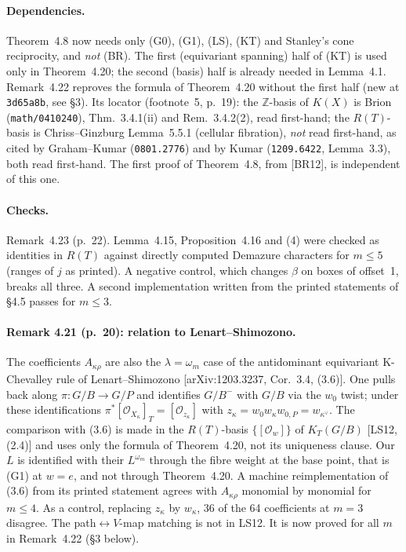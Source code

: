 \documentclass[11pt]{article}
\theoremstyle{plain}
\theoremstyle{remark}
\newcommand{\cO}{\mathcal{O}}
\begin{document}
\paragraph{Dependencies.} Theorem~4.8 now needs only (G0), (G1), (LS), (KT) and Stanley's cone
reciprocity, and \emph{not} (BR). The first (equivariant spanning) half of (KT) is used only in Theorem~4.20; the second (basis) half is already needed in Lemma~4.1. Remark~4.22 reproves the formula of Theorem~4.20 without the first half (new at \texttt{3d65a8b}, see \S3). Its locator (footnote~5,
p.~19): the $\mathbb{Z}$-basis of $K(X)$ is Brion (\texttt{math/0410240}),
Thm.~3.4.1(ii) and Rem.~3.4.2(2), read first-hand; the $R(T)$-basis is Chriss--Ginzburg
Lemma~5.5.1 (cellular fibration), \emph{not} read first-hand, as cited by Graham--Kumar
(\texttt{0801.2776}) and by Kumar (\texttt{1209.6422}, Lemma~3.3), both read first-hand. The first
proof of Theorem~4.8, from [BR12], is independent of this one.

\paragraph{Checks.} Remark~4.23 (p.~22). Lemma~4.15, Proposition~4.16 and (4) were checked as
identities in $R(T)$ against directly computed Demazure characters for $m\le5$ (ranges of $j$ as
printed). A negative control, which changes $\beta$ on boxes of offset~1, breaks all three. A second
implementation written from the printed statements of \S4.5 passes for $m\le3$.

\paragraph{Remark 4.21 (p.~20): relation to Lenart--Shimozono.} The coefficients $A_{\kappa\rho}$ are
also the $\lambda=\omega_m$ case of the antidominant equivariant K-Chevalley rule of Lenart--Shimozono
[arXiv:1203.3237, Cor.~3.4, (3.6)]. One pulls back along $\pi\colon G/B\to G/P$ and identifies $G/B^-$ with
$G/B$ via the $w_0$ twist; under these identifications
$\pi^*[\cO_{X_\kappa}]_T=[\cO_{z_\kappa}]$ with $z_\kappa=w_0w_\kappa w_{0,P}=w_{\kappa^\vee}$. The
comparison with (3.6) is made in the $R(T)$-basis $\{[\cO_w]\}$ of $K_T(G/B)$ [LS12, (2.4)] and uses
only the formula of Theorem~4.20, not its uniqueness clause. Our $L$ is identified with their $L^{\omega_m}$ through the fibre weight at
the base point, that is (G1) at $w=e$, and not through Theorem~4.20. A machine reimplementation of
(3.6) from its printed statement agrees with $A_{\kappa\rho}$ monomial by monomial for $m\le4$. As a
control, replacing $z_\kappa$ by $w_\kappa$, 36 of the 64 coefficients at $m=3$ disagree. The path$\leftrightarrow$$V$-map
matching is not in LS12. It is now proved for all $m$ in Remark~4.22 (\S3 below).
\end{document}
